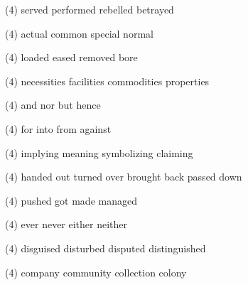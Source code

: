 \item
\begin{tasks}(4)
	\task served
	\task performed
	\task rebelled
	\task betrayed
\end{tasks}
\item
\begin{tasks}(4)
	\task actual
	\task common
	\task special
	\task normal
\end{tasks}
\item
\begin{tasks}(4)
	\task loaded
	\task eased
	\task removed
	\task bore
\end{tasks}
\item
\begin{tasks}(4)
	\task necessities
	\task facilities
	\task commodities
	\task properties
\end{tasks}
\item
\begin{tasks}(4)
	\task and
	\task nor
	\task but
	\task hence
\end{tasks}
\item
\begin{tasks}(4)
	\task for
	\task into
	\task from
	\task against
\end{tasks}
\item
\begin{tasks}(4)
	\task implying
	\task meaning
	\task symbolizing
	\task claiming
\end{tasks}
\item
\begin{tasks}(4)
	\task handed out
	\task turned over
	\task brought back
	\task passed down
\end{tasks}
\item
\begin{tasks}(4)
	\task pushed
	\task got
	\task made
	\task managed
\end{tasks}
\item
\begin{tasks}(4)
	\task ever
	\task never
	\task either
	\task neither
\end{tasks}
\item
\begin{tasks}(4)
	\task disguised
	\task disturbed
	\task disputed
	\task distinguished
\end{tasks}
\item
\begin{tasks}(4)
	\task company
	\task community
	\task collection
	\task colony
\end{tasks}
\item
